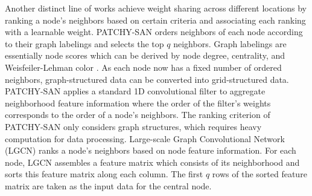     Another distinct line of works achieve weight sharing across different locations by ranking a node's neighbors based on certain criteria and associating each ranking with a learnable weight. PATCHY-SAN \cite{niepert2016learning} orders neighbors of each node according to their graph labelings and selects the top $q$ neighbors.  Graph labelings are essentially node scores which can be derived by node degree, centrality, and Weisfeiler-Lehman color \cite{weisfeiler1968reduction,douglas2011weisfeiler}.  As each node now has a fixed number of ordered neighbors, graph-structured data can be converted into grid-structured data. PATCHY-SAN applies a standard 1D convolutional filter to aggregate neighborhood feature information where the order of the filter's weights corresponds to the order of a node's neighbors.
    The ranking criterion of PATCHY-SAN only considers graph structures, which requires heavy computation for data processing.  Large-scale Graph Convolutional Network (LGCN) \cite{gao2018large} ranks a node's neighbors based on node feature information. For each node, LGCN assembles a feature matrix which consists of its neighborhood and sorts this feature matrix along each column. The first $q$ rows of the sorted feature matrix are taken as the input data for the central node. %
    
    
    
	
